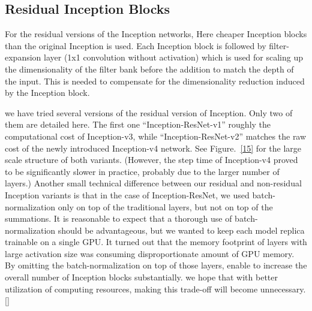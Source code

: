 \documentclass[a4paper,12pt, twoside]{NITKReport}
\begin{document}
\subsection{Residual Inception Blocks}
\par For the residual versions of the Inception networks, Here cheaper Inception  blocks than the original Inception is used. Each Inception block is followed by filter-expansion layer (1x1 convolution  without  activation) which is used  for scaling up the dimensionality of the filter bank before the addition to match the depth of the input. This is needed to compensate for the dimensionality reduction induced by the Inception block.
\par we have tried several versions of the residual version of Inception. Only  two  of them are detailed here. The first one “Inception-ResNet-v1” roughly the computational cost of Inception-v3, while “Inception-ResNet-v2” matches the raw cost of the newly introduced Inception-v4 network. See Figure.~\ref{15} for the large scale structure of both variants. (However, the step time of Inception-v4 proved to be significantly slower in practice, probably due to the larger number of layers.)
Another  small  technical  difference  between  our  residual and non-residual Inception variants is that in the case of Inception-ResNet, we used batch-normalization only on top of the traditional layers, but not on top of the summations. It is reasonable to expect that a thorough use of batch-normalization  should be advantageous, but we wanted to keep each model replica trainable on a single GPU. It turned out that the memory footprint of layers with large activation size was consuming disproportionate amount of GPU memory. By omitting the batch-normalization on top of those layers, enable to increase the overall number
of Inception blocks substantially. we hope that with better utilization of computing resources, making this trade-off will become unnecessary.[\cite{DBLP:journals/corr/SzegedyIV16}]
\end{document}
